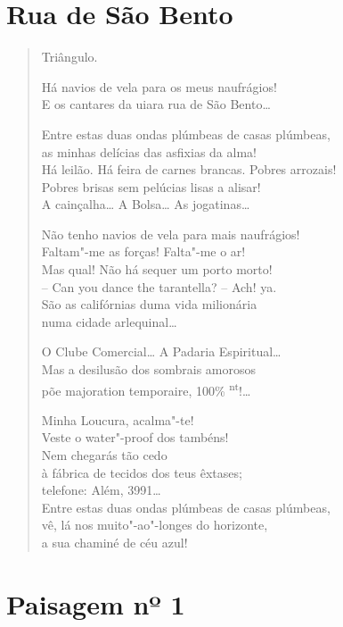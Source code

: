 \chapter{Rua de São Bento}

\begin{verse}
Triângulo.

Há navios de vela para os meus naufrágios!\\
E os cantares da uiara rua de São Bento\ldots{}

Entre estas duas ondas plúmbeas de casas plúmbeas,\\
as minhas delícias das asfixias da alma!\\
Há leilão. Há feira de carnes brancas. Pobres arrozais!\\
Pobres brisas sem pelúcias lisas a alisar!\\
A cainçalha\ldots{} A Bolsa\ldots{} As jogatinas\ldots{}

Não tenho navios de vela para mais naufrágios!\\
Faltam"-me as forças! Falta"-me o ar!\\
Mas qual! Não há sequer um porto morto!\\
-- Can you dance the tarantella? -- Ach! ya.\\
São as califórnias duma vida milionária\\
numa cidade arlequinal\ldots{}

O Clube Comercial\ldots{} A Padaria Espiritual\ldots{}\\
Mas a desilusão dos sombrais amorosos\\
põe majoration temporaire, 100\% \textsuperscript{nt}!\ldots{}

Minha Loucura, acalma"-te!\\
Veste o water"-proof dos tambéns!\\
Nem chegarás tão cedo\\
à fábrica de tecidos dos teus êxtases;\\
telefone: Além, 3991\ldots{}\\
Entre estas duas ondas plúmbeas de casas plúmbeas,\\
vê, lá nos muito"-ao"-longes do horizonte,\\
a sua chaminé de céu azul!
\end{verse}

\chapter{Paisagem nº 1}

